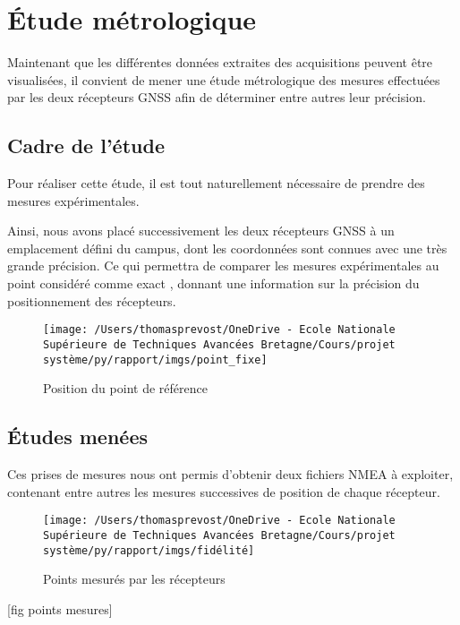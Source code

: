 \section{Étude métrologique}\label{sec:etude-metrologique}
   Maintenant que les différentes données extraites des acquisitions peuvent être visualisées, il convient de mener une étude métrologique des mesures effectuées par les deux récepteurs GNSS afin de déterminer entre autres leur précision.

   \subsection{Cadre de l'étude}\label{subsec:cadre-de-l'etude}
      Pour réaliser cette étude, il est tout naturellement nécessaire de prendre des mesures expérimentales.

      Ainsi, nous avons placé successivement les deux récepteurs GNSS à un emplacement défini du campus, dont les coordonnées sont connues avec une très grande précision.
      Ce qui permettra de comparer les mesures expérimentales au point considéré comme \og exact \fg{}, donnant une information sur la précision du positionnement des récepteurs.

      \begin{figure}[h]
          \centering
          \texttt{[image: /Users/thomasprevost/OneDrive - Ecole Nationale Supérieure de Techniques Avancées Bretagne/Cours/projet système/py/rapport/imgs/point\_fixe]}
          \caption{Position du point de référence}
          \label{fig:pt-fixe}
      \end{figure}

   \subsection{Études menées}\label{subsec:etudes-menees}
      Ces prises de mesures nous ont permis d'obtenir deux fichiers NMEA à exploiter, contenant entre autres les mesures successives de position de chaque récepteur.

      \begin{figure}[h]
          \centering
          \texttt{[image: /Users/thomasprevost/OneDrive - Ecole Nationale Supérieure de Techniques Avancées Bretagne/Cours/projet système/py/rapport/imgs/fidélité]}
          \caption{Points mesurés par les récepteurs}
          \label{fig:fidel}
      \end{figure}[fig points mesures]

